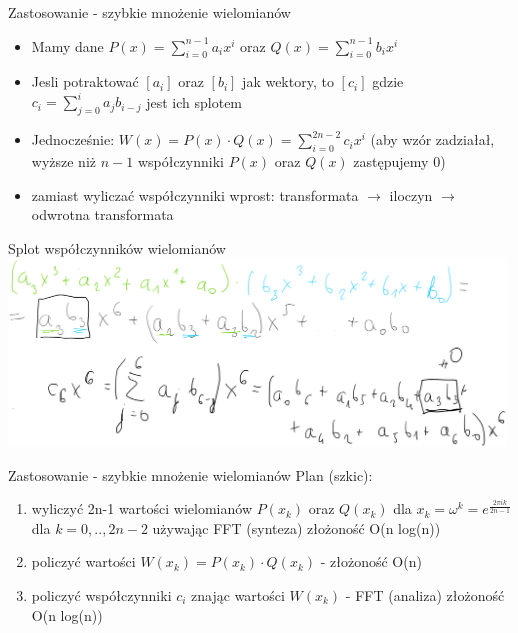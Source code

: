 \begin{frame}{Zastosowanie - szybkie mnożenie wielomianów}
\begin{itemize}
    \item Mamy dane $P(x)=\sum_{i=0}^{n-1}a_i x^i$
  oraz $Q(x)=\sum_{i=0}^{n-1}b_i x^i$
  \item Jesli potraktować $[a_i]$ oraz $[b_i]$ jak wektory, to $[c_i]$ gdzie
  $c_i=\sum_{j=0}^{i} a_j b_{i-j} $ jest ich splotem
  \item Jednocześnie:
  $W(x)=P(x)\cdot Q(x)=\sum_{i=0}^{2n-2}c_i x^i$ (aby wzór zadziałał, wyższe niż $n-1$ współczynniki $P(x)$ oraz $Q(x)$ zastępujemy 0)
  \item zamiast wyliczać współczynniki wprost: transformata $\rightarrow$ iloczyn $\rightarrow$ odwrotna transformata
\end{itemize}
\end{frame}
\begin{frame}{Splot współczynników wielomianów}
\includegraphics[width=0.99\textwidth]{img/16/splotywiel.png}    
\end{frame}
\begin{frame}{Zastosowanie - szybkie mnożenie wielomianów}
 Plan (szkic):
  \begin{enumerate}
      \item wyliczyć 2n-1 wartości wielomianów $P(x_k)$ oraz $Q(x_k)$ dla $x_k=\omega^k=e^{\frac{2\pi i k }{2n-1} }$ dla $k = 0,..,2n-2$ używając FFT (synteza) złożoność O(n log(n))
      \item policzyć wartości $W(x_k)=P(x_k)\cdot Q(x_k)$ - złożoność O(n)
      \item policzyć współczynniki $c_i$ znając wartości $W(x_k)$ - FFT (analiza) złożoność O(n log(n))
  \end{enumerate}
\end{frame}